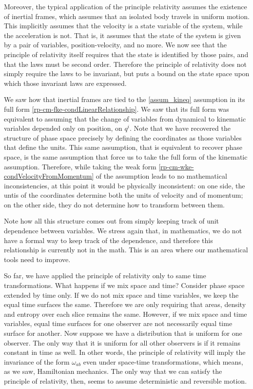 Moreover, the typical application of the principle relativity assumes the existence of inertial frames, which assumes that an isolated body travels in uniform motion. This implicitly assumes that the velocity is a state variable of the system, while the acceleration is not. That is, it assumes that the state of the system is given by a pair of variables, position-velocity, and no more. We now see that the principle of relativity itself requires that the state is identified by those pairs, and that the laws must be second order. Therefore the principle of relativity does not simply require the laws to be invariant, but puts a bound on the state space upon which those invariant laws are expressed.

We saw how that inertial frames are tied to the \ref{assum_kineq} assumption in its full form \ref{rp-cm-fke-condLinearRelationship}. We saw that its full form was equivalent to assuming that the change of variables from dynamical to kinematic variables depended only on position, on $q^i$. Note that we have recovered the structure of phase space precisely by defining the coordinates as those variables that define the units. This same assumption, that is equivalent to recover phase space, is the same assumption that force us to take the full form of the kinematic assumption. Therefore, while taking the weak form \ref{rp-cm-wke-condVelocityFromMomentum} of the assumption leads to no mathematical inconsistencies, at this point it would be physically inconsistent: on one side, the untis of the coordinates determine both the units of velocity and of momentum; on the other side, they do not determine how to transform between them.

Note how all this structure comes out from simply keeping track of unit dependence between variables. We stress again that, in mathematics, we do not have a formal way to keep track of the dependence, and therefore this relationship is currently not in the math. This is an area where our mathematical tools need to improve.

So far, we have applied the principle of relativity only to same time transformations. What happens if we mix space and time? Consider phase space extended by time only. If we do not mix space and time variables, we keep the equal time surfaces the same. Therefore we are only requiring that areas, density and entropy over each slice remains the same. However, if we mix space and time variables, equal time surfaces for one observer are not necessarily equal time surface for another. Now suppose we have a distribution that is uniform for one observer. The only way that it is uniform for all other observers is if it remains constant in time as well. In other words, the principle of relativity will imply the invariance of the form $\omega_{ab}$ even under space-time transformations, which means, as we saw, Hamiltonian mechanics. The only way that we can satisfy the principle of relativity, then, seems to assume deterministic and reversible motion.


